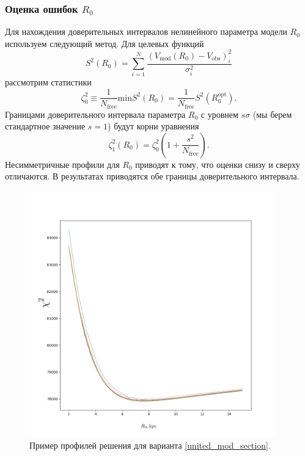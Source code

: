 \documentclass{matmex-diploma-custom}
\begin{document}
\subsubsection{Оценка ошибок $R_0$} \label{err_r0}
Для нахождения доверительных интервалов нелинейного параметра модели $R_0$ используем следующий метод. Для целевых функций
\begin{equation}
        S^2(R_0) = \sum_{i=1}^N \frac{\left(V_{\mathrm{mod}}(R_0) - V_{\mathrm{obs}} \right)^2_i}{\sigma_i^2}
\end{equation}
рассмотрим статистики 
\begin{equation}
        \zeta^2_0 \equiv \frac{1}{N_{\mathrm{free}}} \mathrm{min} S^2(R_0) = \frac{1}{N_{\mathrm{free}}} S^2(R_0^{\mathrm{opt}}).
\end{equation}
Границами доверительного интервала параметра $R_0$ с уровнем $s \sigma$ (мы берем стандартное значение $s = 1$) будут корни уравнения
\begin{equation}
        \zeta^2_1(R_0) = \zeta_0^2 \left( 1 + \frac{s^2}{N_{\mathrm{free}}} \right).
\end{equation}
Несимметричные профили для $R_0$ приводят к тому, что оценки снизу и сверху отличаются. В результатах приводятся обе границы доверительного интервала. 


\begin{figure}[h!]
        \caption{Пример профилей решения для варианта \ref{united_mod_section}.}
        \begin{center}
\begin{minipage}[h]{0.8\linewidth}
        \includegraphics[width=0.95\textwidth]{../imgs/profiles.png}
\end{minipage}
        \end{center}
\end{figure}
\end{document}
